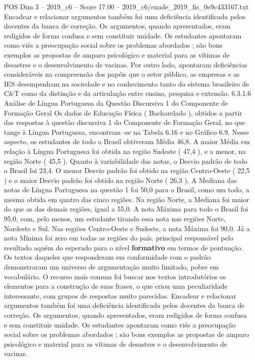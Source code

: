 \begin{textsample}{POS Dim 3 – 2019\_c6 – Score 17.00 – 2019\_c6/enade\_2019\_fis\_0e9c433167.txt}
Encadear e relacionar argumentos também foi uma deficiência identificada pelos docentes da banca de correção.
Os argumentos, quando apresentados, eram redigidos de forma confusa e sem constituir unidade.
Os estudantes apontaram como viés a preocupação social sobre os problemas abordados ; são bons exemplos as propostas de amparo psicológico e material para as vítimas de desastres e o desenvolvimento de vacinas.
Por outro lado, apontaram deficiências consideráveis na compreensão dos papéis que o setor público, as empresas e as IES desempenham na sociedade e no conhecimento tanto do sistema brasileiro de C\&T como da distinção e da articulação entre ensino, pesquisa e extensão. 6.3.1.6 Análise de Língua Portuguesa da Questão Discursiva 1 do Componente de Formação Geral Os dados de Educação Física ( Bacharelado ), obtidos a partir das respostas à questão discursiva 1 do Componente de Formação Geral, no que tange à Língua Portuguesa, encontram -se na Tabela 6.16 e no Gráfico 6.9.
Nesse aspecto, os estudantes de todo o Brasil obtiveram Média 46,8.
A maior Média em relação à Língua Portuguesa foi obtida na região Sudeste ( 47,4 ), e a menor, na região Norte ( 45,5 ).
Quanto à variabilidade das notas, o Desvio padrão de todo o Brasil foi 23,4.
O menor Desvio padrão foi obtido na região Centro-Oeste ( 22,5 ) e o maior Desvio padrão foi obtido na região Norte ( 26,3 ).
A Mediana das notas de Língua Portuguesa na questão 1 foi 50,0 para o Brasil, como um todo, a mesma obtida em quatro das cinco regiões.
Na região Norte, a Mediana foi maior do que as das demais regiões, igual a 55,0.
A nota Máxima para todo o Brasil foi 95,0, com, pelo menos, um estudante tirando essa nota nas regiões Norte, Nordeste e Sul.
Nas regiões Centro-Oeste e Sudeste, a nota Máxima foi 90,0.
Já a nota Mínima foi zero em todas as regiões do país. principal responsável pelo resultado aquém do esperado para o nível \textbf{formativo} em termos de pontuação.
Os textos daqueles que responderam em conformidade com o padrão demonstraram um universo de argumentação muito limitado, pobre em vocabulário.
O recurso mais comum foi buscar nos textos introdutórios os elementos para a construção de suas frases, o que criou uma peculiaridade interessante, com grupos de respostas muito parecidas.
Encadear e relacionar argumentos também foi uma deficiência identificada pelos docentes da banca de correção.
Os argumentos, quando apresentados, eram redigidos de forma confusa e sem constituir unidade.
Os estudantes apontaram como viés a preocupação social sobre os problemas abordados ; são bons exemplos as propostas de amparo psicológico e material para as vítimas de desastres e o desenvolvimento de vacinas.

\end{textsample}
